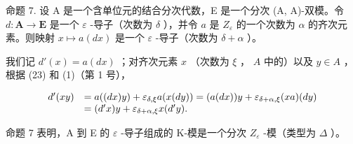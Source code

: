 命题 7. 设 A 是一个含单位元的结合分次代数，E 是一个分次 (A, A)-双模。令 \(d: \mathbf{A} \to \mathbf{E}\) 是一个 \(\varepsilon\) -导子（次数为 \(\delta\) ），并令 \(a\) 是 \(Z_{\varepsilon}\) 的一个次数为 \(\alpha\) 的齐次元素。则映射 \(x \mapsto a(dx)\) 是一个 \(\varepsilon\) -导子（次数为 \(\delta + \alpha\) ）。

我们记 \(d'(x) = a(dx)\) ；对齐次元素 \(x\) （次数为 \(\xi\) ， \(A\) 中的）以及 \(y \in A\) ，根据 (23) 和 (1)（第 1 号），

\[
\begin{array}{r l} d ^ {\prime} (x y) & = a ((d x) y) + \varepsilon_ {\delta , \xi} a (x (d y)) = (a (d x)) y + \varepsilon_ {\delta + \alpha , \xi} (x a) (d y) \\ & = (d ^ {\prime} x) y + \varepsilon_ {\delta + \alpha , \xi} x (d ^ {\prime} y). \end{array}
\]

命题 7 表明，A 到 E 的 \(\varepsilon\) -导子组成的 K-模是一个分次 \(Z_{\varepsilon}\) -模（类型为 \(\Delta\) ）。

